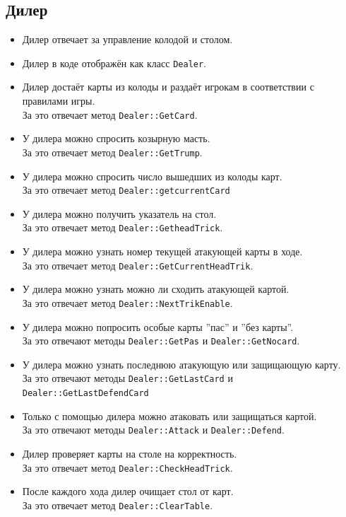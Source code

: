\documentclass[a4paper,12pt]{article}
\begin{document}
        \subsection{Дилер}
            \begin{itemize}
                \item[] Дилер отвечает за управление колодой и столом.
                \item[] Дилер в коде отображён как класс \texttt{Dealer}.
                \item[] Дилер достаёт карты из колоды и раздаёт игрокам в соответствии с правилами игры.\\
                        За это отвечает метод \texttt{Dealer::GetCard}.
                \item[] У дилера можно спросить козырную масть.\\
                        За это отвечает метод \texttt{Dealer::GetTrump}.
                \item[] У дилера можно спросить число вышедших из колоды карт.\\
                        За это отвечает метод \texttt{Dealer::getcurrentCard}
                \item[] У дилера можно получить указатель на стол.\\
                        За это отвечает метод \texttt{Dealer::GetheadTrick}.
                \item[] У дилера можно узнать номер текущей атакующей карты в ходе.\\
                        За это отвечает метод \texttt{Dealer::GetCurrentHeadTrik}.
                \item[] У дилера можно узнать можно ли сходить атакующей картой.\\
                        За это отвечает метод \texttt{Dealer::NextTrikEnable}.
                \item[] У дилера можно попросить особые карты ''пас'' и ''без карты''.\\
                        За это отвечают методы \texttt{Dealer::GetPas} и \texttt{Dealer::GetNocard}.
                \item[] У дилера можно узнать последнюю атакующую или защищающую карту.\\
                        За это отвечают методы \texttt{Dealer::GetLastCard} и \texttt{Dealer::GetLastDefendCard}
                \item[] Только с помощью дилера можно атаковать или защищаться картой.\\
                        За это отвечают методы \texttt{Dealer::Attack} и \texttt{Dealer::Defend}.
                \item[] Дилер проверяет карты на столе на корректность.\\
                        За это отвечает метод \texttt{Dealer::CheckHeadTrick}.
                \item[] После каждого хода дилер очищает стол от карт.\\
                        За это отвечает метод \texttt{Dealer::ClearTable}.
            \end{itemize}
            
\end{document}
